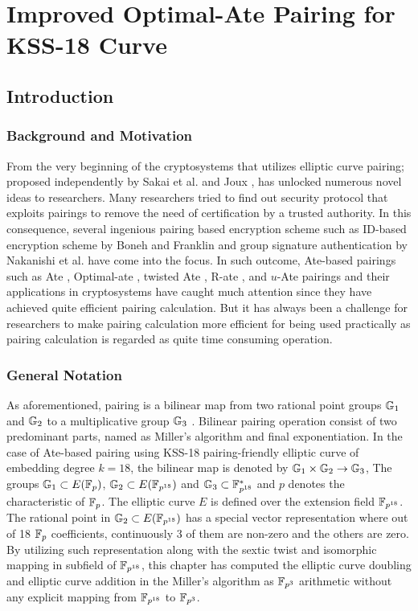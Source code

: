 \chapter{Improved Optimal-Ate Pairing for KSS-18 Curve} 
\label{ch:optate_kss18_icisc2016}

\section{Introduction}
\label{ch:icisc2016:intro}

\subsection{Background and Motivation}
\label{sec:ch:icisc:bac_motivation}
From the very beginning of the cryptosystems that utilizes elliptic curve pairing; proposed independently by Sakai et al. \cite{EPRINT:SakKas03} and Joux \cite{JC:Joux04}, has unlocked numerous novel ideas to researchers. 
Many researchers tried to find out security protocol that exploits pairings to remove the need of certification by a trusted authority. 
In this consequence, several ingenious pairing based encryption scheme such as ID-based encryption scheme by  Boneh and Franklin \cite{C:BonFra01} and group signature authentication by Nakanishi et al. \cite{AC:NakFun05} have come into the focus. 
In such outcome, Ate-based pairings such as Ate \cite{DBLP:reference/crc/2005ehcc}, Optimal-ate \cite{DBLP:journals/tit/Vercauteren10}, twisted Ate \cite{EPRINT:MKHO07},  R-ate \cite{r_ate}, and $u$-Ate \cite{PAIRING:NASKM08} pairings and their applications in cryptosystems have caught much attention since they have achieved quite efficient pairing calculation.
But it has always been a challenge for researchers to make pairing calculation more efficient for being used practically as pairing calculation is regarded as quite time consuming operation. 

\subsection{General Notation}
\label{sec:ch:icisc:notation}
As aforementioned, pairing is a bilinear map from two rational point groups ${\mathbb{G}}_{1}$ and ${\mathbb{G}}_{2}$ to a multiplicative group ${\mathbb{G}}_{3}$ \cite{Silverman}.
Bilinear pairing operation consist of two predominant parts,  named as Miller's algorithm and final exponentiation.
In  the case of  Ate-based pairing using KSS-18 pairing-friendly elliptic curve of embedding degree $k=18$,  the bilinear map is denoted by ${\mathbb{G}}_{1} \times {\mathbb{G}}_{2} \rightarrow {\mathbb{G}}_{3}$,
The groups ${\mathbb{G}}_{1} \subset E(\mathbb{F}_p)$, ${\mathbb{G}}_{2} \subset E(\mathbb{F}_{p^{18}})$ and ${\mathbb{G}}_{3}  \subset \mathbb{F}^*_{p^{18}}$ and  $p$ denotes the characteristic of ${\mathbb{F}}_{p}$.
 The elliptic curve $E$ is defined over the extension field $\mathbb{F}_{p^{18}}$. 
The rational point in ${\mathbb{G}}_{2} \subset E(\mathbb{F}_{p^{18}})$ has  a special vector representation where out of 18 ${\mathbb{F}}_{p}$ coefficients, continuously 3 of them are non-zero and the others are zero. 
By utilizing such representation along with the sextic twist and isomorphic mapping in subfield of $\mathbb{F}_{p^{18}}$, this chapter has computed the elliptic curve doubling and elliptic curve addition in the Miller's algorithm as $\mathbb{F}_{p^3}$ arithmetic without any explicit mapping from $\mathbb{F}_{p^{18}}$ to $\mathbb{F}_{p^3}$.

